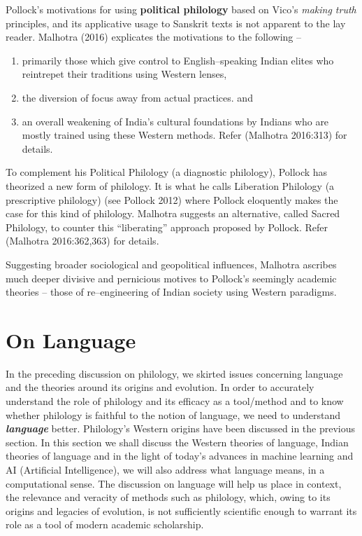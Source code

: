 Pollock’s motivations for using \textbf{political philology} based on Vico’s \textit{making truth} principles, and its applicative usage to Sanskrit texts is not apparent to the lay reader. Malhotra (2016) explicates the motivations to the following –

\begin{enumerate}
\itemsep=0pt
\item primarily those which give control to English–speaking Indian elites who reintrepet their traditions using Western lenses,

 \item the diversion of focus away from actual practices. and

 \item an overall weakening of India’s cultural foundations by Indians who are mostly trained using these Western methods. Refer (Malhotra 2016:313) for details.

\end{enumerate}

To complement his Political Philology (a diagnostic philology), Pollock has theorized a new form of philology. It is what he calls Liberation Philology (a prescriptive philology) (see Pollock 2012) where Pollock eloquently makes the case for this kind of philology. Malhotra suggests an alternative, called Sacred Philology, to counter this “liberating” approach proposed by Pollock. Refer (Malhotra 2016:362,363) for details.

Suggesting broader sociological and geopolitical influences, Malhotra ascribes much deeper divisive and pernicious motives to Pollock’s seemingly academic theories – those of re–engineering of Indian society using Western paradigms.


\section*{On Language}

\vskip -6pt

In the preceding discussion on philology, we skirted issues concerning language and the theories around its origins and evolution. In order to accurately understand the role of philology and its efficacy as a tool/method and to know whether philology is faithful to the notion of language, we need to understand \textbf{\textit{language}} better. Philology’s Western origins have been discussed in the previous section. In this section we shall discuss the Western theories of language, Indian theories of language and in the light of today’s advances in machine learning and AI (Artificial Intelligence), we will also address what language means, in a computational sense. The discussion on language will help us place in context, the relevance and veracity of methods such as philology, which, owing to its origins and legacies of evolution, is not sufficiently scientific enough to warrant its role as a tool of modern academic scholarship.


